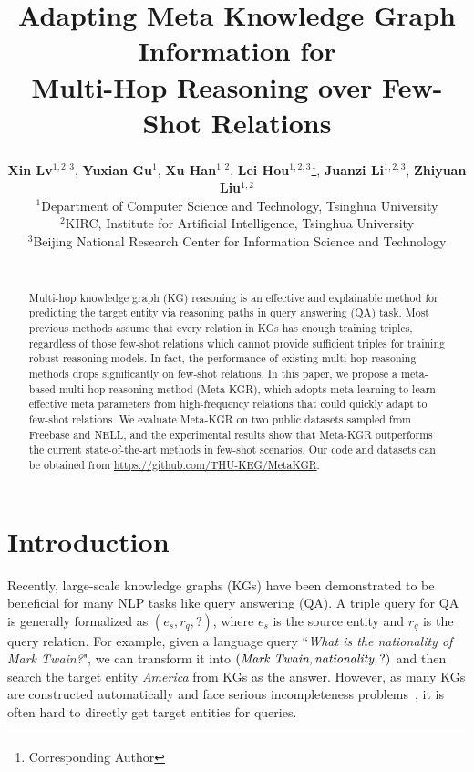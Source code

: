 \documentclass[11pt,a4paper]{article}
\title{Adapting Meta Knowledge Graph Information for \\ Multi-Hop Reasoning over Few-Shot Relations}
\author{
    \textbf{Xin Lv}$^{1,2,3}$, \textbf{Yuxian Gu}$^{1}$, \textbf{Xu Han}$^{1,2}$, \textbf{Lei Hou}$^{1,2,3}$\thanks{\quad Corresponding Author}\hspace{0.5em}, \textbf{Juanzi Li}$^{1,2,3}$, \textbf{Zhiyuan Liu}$^{1,2}$\\
    $^1$Department of Computer Science and Technology, Tsinghua University \\
    $^2$KIRC, Institute for Artificial Intelligence, Tsinghua University \\
     $^3$Beijing National Research Center for Information Science and Technology \\
    \email{\{lv-x18,gu-yx17,hanxu17\}@mails.tsinghua.edu.cn}\\
    \email{\{houlei,lijuanzi,liuzy\}@tsinghua.edu.cn}
    }
\date{}
\begin{document}
\maketitle
\begin{abstract}
Multi-hop knowledge graph (KG) reasoning is an effective and explainable method for predicting the target entity via reasoning paths in query answering (QA) task. Most previous methods assume that every relation in KGs has enough training triples, regardless of those few-shot relations which cannot provide sufficient triples for training robust reasoning models. In fact, the performance of existing multi-hop reasoning methods drops significantly on few-shot relations. In this paper, we propose a meta-based multi-hop reasoning method (Meta-KGR), which adopts meta-learning to learn effective meta parameters from high-frequency relations that could quickly adapt to few-shot relations. We evaluate Meta-KGR on two public datasets sampled from Freebase and NELL, and the experimental results show that Meta-KGR outperforms the current state-of-the-art methods in few-shot scenarios. Our code and datasets can be obtained from  \url{https://github.com/THU-KEG/MetaKGR}.

\end{abstract}

\section{Introduction}

Recently, large-scale knowledge graphs (KGs) have been demonstrated to be beneficial for many NLP tasks like query answering (QA). A triple query for QA is generally formalized as $(e_s, r_q, ?)$, where $e_s$ is the source entity and $r_q$ is the query relation. 
For example, given a language query ``\textit{What is the nationality of Mark Twain?}", we can transform it into $(\emph{Mark Twain}, \textit{nationality}, ?)$ and then search the target entity \emph{America} from KGs as the answer.
However, as many KGs are constructed automatically and face serious incompleteness problems~\cite{TransE}, it is often hard to directly get target entities for queries.
\end{document}
